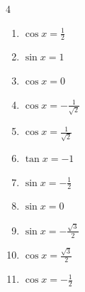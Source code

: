 \begin{multicols}{4}
\begin{enumerate}
  \item $\displaystyle \cos{x}  = \frac{1}{2}$


  \item $\displaystyle \sin{x}  = 1$


  \item $\displaystyle \cos{x}  = 0$


  \item $\displaystyle \cos{x}  = -\frac{1}{\sqrt{2}}$


  \item $\displaystyle \cos{x}  = \frac{1}{\sqrt{2}}$


  \item $\displaystyle \tan{x}  = -1$


\columnbreak %

  \item $\displaystyle \sin{x}  = -\frac{1}{2}$


  \item $\displaystyle \sin{x}  = 0$

        \phantom{$\displaystyle x = 0 , \pi$}

  \item $\displaystyle \sin{x}  = -\frac{\sqrt{3}}{2}$


  \item $\displaystyle \cos{x}  = \frac{\sqrt{3}}{2}$


  \item $\displaystyle \cos{x}  = -\frac{1}{2}$



\end{enumerate}
\end{multicols}
